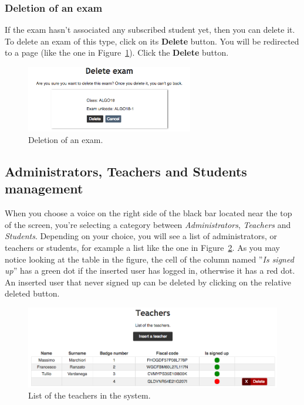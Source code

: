 \subsubsection{Deletion of an exam}
If the exam hasn't associated any subscribed student yet, then you can delete it. To delete an exam of this type, click on its \textbf{Delete} button. You will be redirected to a page (like the one in Figure~\ref{fig:deleteExam}). Click the \textbf{Delete} button.%
\begin{figure}[H]
	\centering
	\includegraphics[width=0.65\textwidth]{img/deleteExam.png}
	\caption{Deletion of an exam.}
	\label{fig:deleteExam}
\end{figure}

\subsection{Administrators, Teachers and Students management} \label{subsec:ats}
When you choose a voice on the right side of the black bar located near the top of the screen, you're selecting a category between \emph{Administrators}, \emph{Teachers} and \emph{Students}.  Depending on your choice, you will see a list of administrators, or teachers or students, for example a list like the one in Figure~\ref{fig:userList}. As you may notice looking at the table in the figure, the cell of the column named ''\emph{Is signed up}'' has a green dot if the inserted user has logged in, otherwise it has a red dot. An inserted user that never signed up can be deleted by clicking on the relative deleted button.
\begin{figure}[H]
	\centering
	\includegraphics[width=1.0\textwidth]{img/userList.png}
	\caption{List of the teachers in the system.}
	\label{fig:userList}
\end{figure}

